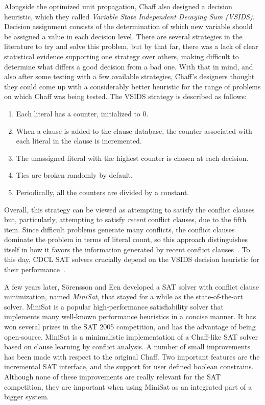 Alongside the optimized unit propagation, Chaff also designed a decision
heuristic, which they called \emph{Variable State Independent Decaying Sum
(VSIDS)}. Decision assignment consists of the determination of which new
variable should be assigned a value in each decision level. There are several
strategies in the literature to try and solve this problem, but by that far,
there was a lack of clear statistical evidence supporting one strategy over
others, making difficult to determine what differs a good decision from a bad
one. With that in mind, and also after some testing with a few available
strategies, Chaff's designers thought they could come up with a considerably
better heuristic for the range of problems on which Chaff was being tested. The
VSIDS strategy is described as follows:

\begin{enumerate}
    \item Each literal has a counter, initialized to 0.
    \item When a clause is added to the clause database, the counter associated with
        each literal in the clause is incremented.
    \item The unassigned literal with the highest counter is chosen at each
        decision.
    \item Ties are broken randomly by default.
    \item Periodically, all the counters are divided by a constant.
\end{enumerate}

Overall, this strategy can be viewed as attempting to satisfy the conflict
clauses but, particularly, attempting to satisfy \emph{recent} conflict clauses,
due to the fifth item. Since difficult problems generate many conflicts, the
conflict clauses dominate the problem in terms of literal count, so this
approach distinguishes itself in how it favors the information generated by
recent conflict clauses~\cite{moskewicz2001chaff}. To this day, CDCL SAT solvers
crucially depend on the VSIDS decision heuristic for their
performance~\cite{vsidsincdcl}. 

A few years later, S\"orensson and Een developed a SAT solver with conflict
clause minimization, named \emph{MiniSat}, that stayed for a while as the
state-of-the-art solver. MiniSat is a popular high-performance satisfiability
solver that implements many well-known performance heuristics in a concise
manner. It has won several prizes in the SAT 2005 competition, and has the
advantage of being open-source. MiniSat is a minimalistic implementation of a
Chaff-like SAT solver based on clause learning by conflict analysis. A number of
small improvements has been made with respect to the original Chaff. Two
important features are the incremental SAT interface, and the support for user
defined boolean constrains. Although none of these improvements are really
relevant for the SAT competition, they are important when using MiniSat as an
integrated part of a bigger system. 

